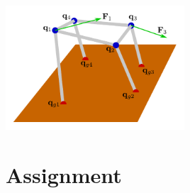 \documentclass{article}
\begin{document}
\begin{center}
\includegraphics[width = 0.5\textwidth]{elastic_mesh_example_5}
\end{center}




\section{Assignment}

\end{document}
